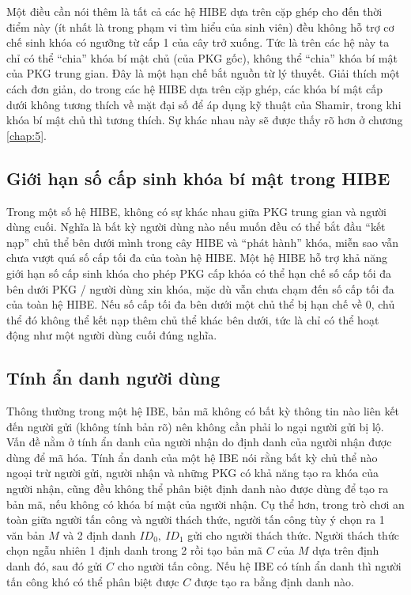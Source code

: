 \documentclass[class=report, crop=false]{standalone}
\begin{document}
			Một điều cần nói thêm là tất cả các hệ HIBE dựa trên cặp ghép cho đến thời điểm này (ít nhất là trong phạm vi tìm hiểu của sinh viên) đều không hỗ trợ cơ chế sinh khóa có ngưỡng từ cấp 1 của cây trở xuống. Tức là trên các hệ này ta chỉ có thể ``chia'' khóa bí mật chủ (của PKG gốc), không thể ``chia'' khóa bí mật của PKG trung gian. Đây là một hạn chế bắt nguồn từ lý thuyết. Giải thích một cách đơn giản, do trong các hệ HIBE dựa trên cặp ghép, các khóa bí mật cấp dưới không tương thích về mặt đại số để áp dụng kỹ thuật của Shamir, trong khi khóa bí mật chủ thì tương thích. Sự khác nhau này sẽ được thấy rõ hơn ở chương \ref{chap:5}.
		\subsection{Giới hạn số cấp sinh khóa bí mật trong HIBE}
			Trong một số hệ HIBE, không có sự khác nhau giữa PKG trung gian và người dùng cuối. Nghĩa là bất kỳ người dùng nào nếu muốn đều có thể bắt đầu ``kết nạp'' chủ thể bên dưới mình trong cây HIBE và ``phát hành'' khóa, miễn sao vẫn chưa vượt quá số cấp tối đa của toàn hệ HIBE. Một hệ HIBE hỗ trợ khả năng giới hạn số cấp sinh khóa cho phép PKG cấp khóa có thể hạn chế số cấp tối đa bên dưới PKG / người dùng xin khóa, mặc dù vẫn chưa chạm đến số cấp tối đa của toàn hệ HIBE. Nếu số cấp tối đa bên dưới một chủ thể bị hạn chế về $0$, chủ thể đó không thể kết nạp thêm chủ thể khác bên dưới, tức là chỉ có thể hoạt động như một người dùng cuối đúng nghĩa.
		\subsection{Tính ẩn danh người dùng}
			Thông thường trong một hệ IBE, bản mã không có bất kỳ thông tin nào liên kết đến người gửi (không tính bản rõ) nên không cần phải lo ngại người gửi bị lộ. Vấn đề nằm ở tính ẩn danh của người nhận do định danh của người nhận được dùng để mã hóa. Tính ẩn danh của một hệ IBE nói rằng bất kỳ chủ thể nào ngoại trừ người gửi, người nhận và những PKG có khả năng tạo ra khóa của người nhận, cũng đều không thể phân biệt định danh nào được dùng để tạo ra bản mã, nếu không có khóa bí mật của người nhận. Cụ thể hơn, trong trò chơi an toàn giữa người tấn công và người thách thức, người tấn công tùy ý chọn ra 1 văn bản $M$ và 2 định danh $ID_0,\ ID_1$ gửi cho người thách thức. Người thách thức chọn ngẫu nhiên 1 định danh trong 2 rồi tạo bản mã $C$ của $M$ dựa trên định danh đó, sau đó gửi $C$ cho người tấn công. Nếu hệ IBE có tính ẩn danh thì người tấn công khó có thể phân biệt được $C$ được tạo ra bằng định danh nào.
\end{document}
